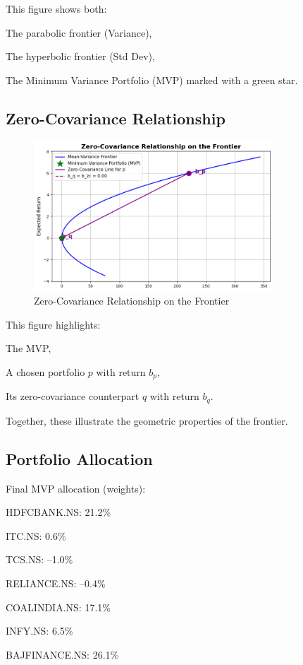 \documentclass[12pt]{article}
\begin{document}
This figure shows both:

The parabolic frontier (Variance),

The hyperbolic frontier (Std Dev),

The Minimum Variance Portfolio (MVP) marked with a green star.

\subsection{Zero-Covariance Relationship}

\begin{figure}[H]
    \centering
    \includegraphics[width=0.8\textwidth]{2.png}
    \caption{Zero-Covariance Relationship on the Frontier}
    \label{fig:zero_covariance}
\end{figure}

This figure highlights:

The MVP,

A chosen portfolio $p$ with return $b_p$,

Its zero-covariance counterpart $q$ with return $b_q$.

Together, these illustrate the geometric properties of the frontier.

\subsection{Portfolio Allocation}

Final MVP allocation (weights):

HDFCBANK.NS: 21.2\%

ITC.NS: 0.6\%

TCS.NS: –1.0\%

RELIANCE.NS: –0.4\%

COALINDIA.NS: 17.1\%

INFY.NS: 6.5\%

BAJFINANCE.NS: 26.1\%
\end{document}
